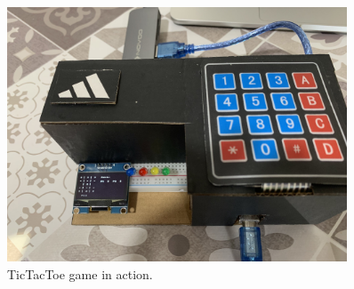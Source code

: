 \documentclass{article}
\begin{document}
\begin{figure}[!h]
  \centering
  \vspace*{\fill}
  \includegraphics[width=0.9\textwidth]{TicTacToeInGame.jpg}
  \caption{TicTacToe game in action.}
  \vspace*{\fill}
\end{figure}
\end{document}
